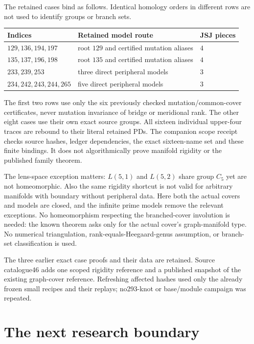 \documentclass[11pt]{article}
\begin{document}
The retained cases bind as follows. Identical homology orders in
different rows are not used to identify groups or branch sets.
\begin{center}
\begin{tabular}{lll}
\toprule
Indices & Retained model route & JSJ pieces\\
\midrule
$129,136,194,197$ & root $129$ and certified mutation aliases & $4$\\
$135,137,196,198$ & root $135$ and certified mutation aliases & $4$\\
$233,239,253$ & three direct peripheral models & $3$\\
$234,242,243,244,265$ & five direct peripheral models & $3$\\
\bottomrule
\end{tabular}
\end{center}
The first two rows use only the six previously checked mutation/common-cover
certificates, never mutation invariance of bridge or meridional rank.
The other eight cases use their own exact source groups. All sixteen
individual upper-four traces are rebound to their literal retained PDs.
The companion scope receipt checks source hashes, ledger dependencies,
the exact sixteen-name set and these finite bindings. It does not
algorithmically prove manifold rigidity or the published family theorem.

The lens-space exception matters: $L(5,1)$ and $L(5,2)$ share group
$C_5$ yet are not homeomorphic. Also the same rigidity shortcut is not
valid for arbitrary manifolds with boundary without peripheral data.
Here both the actual covers and models are closed, and the infinite
prime models remove the relevant exceptions. No homeomorphism respecting
the branched-cover involution is needed: the known theorem asks only for
the actual cover's graph-manifold type. No numerical triangulation,
rank-equals-Heegaard-genus assumption, or branch-set classification is used.

The three earlier exact case proofs and their data are retained. Source
catalogue46 adds one scoped rigidity reference and a published snapshot
of the existing graph-cover reference. Refreshing affected hashes used
only the already frozen small recipes and their replays; no293-knot or
base/module campaign was repeated.

\section{The next research boundary}
\end{document}
